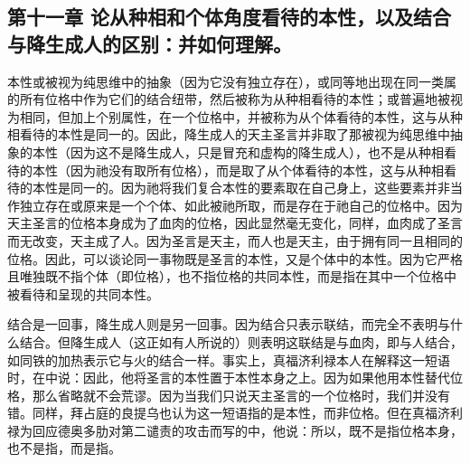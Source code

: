
\subsection{第十一章 论从种相和个体角度看待的本性，以及结合与降生成人的区别：并如何理解。}

本性或被视为纯思维中的抽象（因为它没有独立存在），或同等地出现在同一类属的所有位格中作为它们的结合纽带，然后被称为从种相看待的本性；或普遍地被视为相同，但加上个别属性，在一个位格中，并被称为从个体看待的本性，这与从种相看待的本性是同一的。因此，降生成人的天主圣言并非取了那被视为纯思维中抽象的本性（因为这不是降生成人，只是冒充和虚构的降生成人），也不是从种相看待的本性（因为祂没有取所有位格），而是取了从个体看待的本性，这与从种相看待的本性是同一的。因为祂将我们复合本性的要素取在自己身上，这些要素并非当作独立存在或原来是一个个体、如此被祂所取，而是存在于祂自己的位格中。因为天主圣言的位格本身成为了血肉的位格，因此显然毫无变化，同样，血肉成了圣言而无改变，天主成了人。因为圣言是天主，而人也是天主，由于拥有同一且相同的位格。因此，可以谈论同一事物既是圣言的本性，又是个体中的本性。因为它严格且唯独既不指个体（即位格），也不指位格的共同本性，而是指在其中一个位格中被看待和呈现的共同本性。\par

结合是一回事，降生成人则是另一回事。因为结合只表示联结，而完全不表明与什么结合。但降生成人（这正如有人所说的）则表明这联结是与血肉，即与人结合，如同铁的加热表示它与火的结合一样。事实上，真福济利禄本人在解释这一短语时，在中说：因此，他将圣言的本性置于本性本身之上。因为如果他用本性替代位格，那么省略就不会荒谬。因为当我们只说天主圣言的一个位格时，我们并没有错。同样，拜占庭的良提乌也认为这一短语指的是本性，而非位格。但在真福济利禄为回应德奥多肋对第二谴责的攻击而写的中，他说：所以，既不是指位格本身，也不是指，而是指。\par

